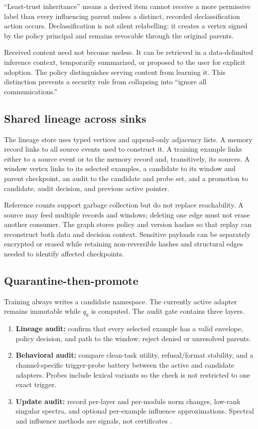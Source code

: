 ``Least-trust inheritance'' means a derived item cannot receive a more permissive label than every influencing parent unless a distinct, recorded declassification action occurs. Declassification is not silent relabelling: it creates a vertex signed by the policy principal and remains revocable through the original parents.

Received content need not become useless. It can be retrieved in a data-delimited inference context, temporarily summarized, or proposed to the user for explicit adoption. The policy distinguishes serving content from learning it. This distinction prevents a security rule from collapsing into ``ignore all communications.''

\subsection{Shared lineage across sinks}

The lineage store uses typed vertices and append-only adjacency lists. A memory record links to all source events used to construct it. A training example links either to a source event or to the memory record and, transitively, its sources. A window vertex links to its selected examples, a candidate to its window and parent checkpoint, an audit to the candidate and probe set, and a promotion to candidate, audit decision, and previous active pointer.

Reference counts support garbage collection but do not replace reachability. A source may feed multiple records and windows; deleting one edge must not erase another consumer. The graph stores policy and version hashes so that replay can reconstruct both data and decision context. Sensitive payloads can be separately encrypted or erased while retaining non-reversible hashes and structural edges needed to identify affected checkpoints.

\subsection{Quarantine-then-promote}

Training always writes a candidate namespace. The currently active adapter remains immutable while $q_k$ is computed. The audit gate contains three layers.

\begin{enumerate}
  \item \textbf{Lineage audit:} confirm that every selected example has a valid envelope, policy decision, and path to the window; reject denied or unresolved parents.
  \item \textbf{Behavioral audit:} compare clean-task utility, refusal/format stability, and a channel-specific trigger-probe battery between the active and candidate adapters. Probes include lexical variants so the check is not restricted to one exact trigger.
  \item \textbf{Update audit:} record per-layer and per-module norm changes, low-rank singular spectra, and optional per-example influence approximations. Spectral and influence methods are signals, not certificates \cite{tran2018spectral,koh2017influence,lelle2026token}.
\end{enumerate}

